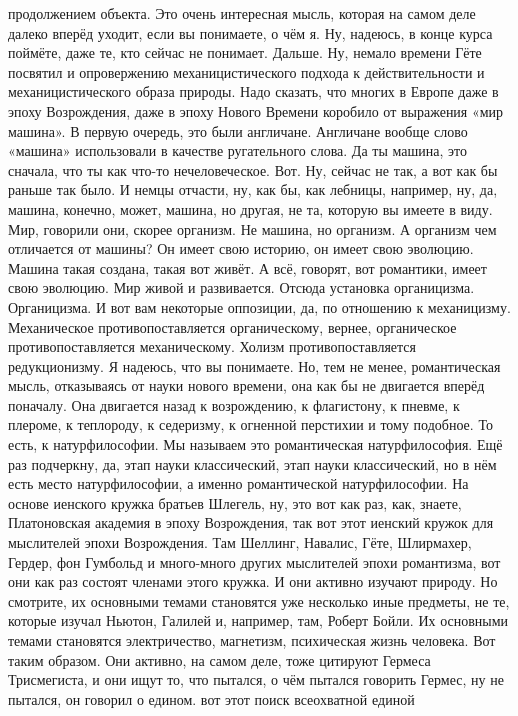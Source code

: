 продолжением объекта. Это очень интересная мысль, которая на самом деле далеко
вперёд уходит, если вы понимаете, о чём я. Ну, надеюсь, в конце курса поймёте,
даже те, кто сейчас не понимает. Дальше. Ну, немало времени Гёте посвятил и
опровержению механицистического подхода к действительности и механицистического
образа природы. Надо сказать, что многих в Европе даже в эпоху Возрождения, даже
в эпоху Нового Времени коробило от выражения «мир машина». В первую очередь, это
были англичане. Англичане вообще слово «машина» использовали в качестве
ругательного слова. Да ты машина, это сначала, что ты как что-то нечеловеческое.
Вот. Ну, сейчас не так, а вот как бы раньше так было. И немцы отчасти, ну, как
бы, как лебницы, например, ну, да, машина, конечно, может, машина, но другая, не
та, которую вы имеете в виду. Мир, говорили они, скорее организм. Не машина, но
организм. А организм чем отличается от машины? Он имеет свою историю, он имеет
свою эволюцию. Машина такая создана, такая вот живёт. А всё, говорят, вот
романтики, имеет свою эволюцию. Мир живой и развивается. Отсюда установка
органицизма. Органицизма. И вот вам некоторые оппозиции, да, по отношению к
механицизму. Механическое противопоставляется органическому, вернее,
органическое противопоставляется механическому. Холизм противопоставляется
редукционизму. Я надеюсь, что вы понимаете. Но, тем не менее, романтическая
мысль, отказываясь от науки нового времени, она как бы не двигается вперёд
поначалу. Она двигается назад к возрождению, к флагистону, к пневме, к плероме,
к теплороду, к седеризму, к огненной перстихии и тому подобное. То есть, к
натурфилософии. Мы называем это романтическая натурфилософия. Ещё раз подчеркну,
да, этап науки классический, этап науки классический, но в нём есть место
натурфилософии, а именно романтической натурфилософии. На основе иенского кружка
братьев Шлегель, ну, это вот как раз, как, знаете, Платоновская академия в эпоху
Возрождения, так вот этот иенский кружок для мыслителей эпохи Возрождения. Там
Шеллинг, Навалис, Гёте, Шлирмахер, Гердер, фон Гумбольд и много-много других
мыслителей эпохи романтизма, вот они как раз состоят членами этого кружка. И они
активно изучают природу. Но смотрите, их основными темами становятся уже
несколько иные предметы, не те, которые изучал Ньютон, Галилей и, например, там,
Роберт Бойли. Их основными темами становятся электричество, магнетизм,
психическая жизнь человека. Вот таким образом. Они активно, на самом деле, тоже
цитируют Гермеса Трисмегиста, и они ищут то, что пытался, о чём пытался говорить
Гермес, ну не пытался, он говорил о едином. вот этот поиск всеохватной единой
